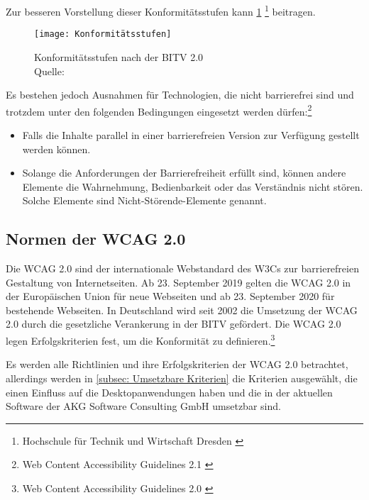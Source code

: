 Zur besseren Vorstellung dieser Konformitätsstufen kann \cref{fig:Konformitätsstufen} \footnote{Hochschule für Technik und Wirtschaft Dresden \cite{HV}} beitragen.

\begin{figure}[H]
	\centering
	\texttt{[image: Konformitätsstufen]}
	\caption[Konformitätsstufen nach der \ac{BITV} 2.0]{Konformitätsstufen nach der \ac{BITV} 2.0 \\Quelle: \cite{HV}}
	\label{fig:Konformitätsstufen}
\end{figure}

\vspace{2cm}

Es bestehen jedoch Ausnahmen für Technologien, die nicht barrierefrei sind und trotzdem unter den folgenden Bedingungen eingesetzt werden dürfen:\footnote{Web Content Accessibility Guidelines 2.1 \cite{WCAG2.1}}

\begin{itemize}
	\item Falls die Inhalte parallel in einer barrierefreien Version zur Verfügung gestellt werden können.
	\item Solange die Anforderungen der Barrierefreiheit erfüllt sind, können andere Elemente die Wahrnehmung, Bedienbarkeit oder das Verständnis nicht 
	stören. Solche Elemente sind Nicht-Störende-Elemente genannt.
\end{itemize}

\subsection{Normen der \ac{WCAG} 2.0}
Die \ac{WCAG} 2.0 sind der internationale Webstandard des \ac{W3C}s zur barrierefreien Gestaltung von Internetseiten. Ab 23. September 2019 gelten die \ac{WCAG} 2.0 in der Europäischen Union für neue Webseiten und ab 23. September 2020 für bestehende Webseiten. In Deutschland wird seit 2002 die Umsetzung der \ac{WCAG} 2.0 durch die gesetzliche Verankerung in der \ac{BITV} gefördert. Die \ac{WCAG} 2.0 legen Erfolgskriterien fest, um die Konformität zu definieren.\footnote{Web Content Accessibility Guidelines 2.0 \cite{WCAG2.0}}

Es werden alle Richtlinien und ihre Erfolgskriterien der \ac{WCAG} 2.0 betrachtet, allerdings werden in \cref{subsec: Umsetzbare Kriterien} die Kriterien ausgewählt, die einen Einfluss 
auf die Desktopanwendungen haben und die in der aktuellen Software der AKG Software Consulting GmbH umsetzbar sind.

